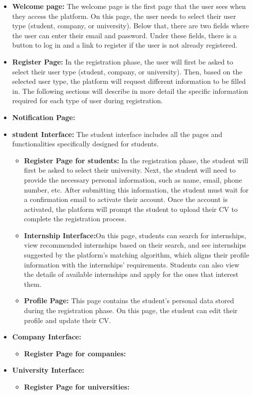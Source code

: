 \begin{itemize}
    \item \textbf{Welcome page:} The welcome page is the first page that the user sees when they access the platform. On this page, the user
    needs to select their user type (student, company, or university). Below that, there are two fields where the user can enter their email
    and password. Under these fields, there is a button to log in and a link to register if the user is not already registered.
    
    \item \textbf{Register Page:} In the registration phase, the user will first be asked to select their user type (student, company, or 
    university). Then, based on the selected user type, the platform will request different information to be filled in. 
    The following sections will describe in more detail the specific information required for each type of user during registration.

    \item \textbf{Notification Page:} 

    \item \textbf{student Interface:} The student interface includes all the pages and functionalities specifically designed for students.
    \begin{itemize}
        \item \textbf{Register Page for students:} In the registration phase, the student will first be asked to select their university. 
        Next, the student will need to provide the necessary personal information, such as name, email, phone number, etc. After submitting
        this information, the student must wait for a confirmation email to activate their account. Once the account is activated, the 
        platform will prompt the student to upload their CV to complete the registration process.

        \item \textbf{Internship Interface:}On this page, students can search for internships, view recommended internships based on their
         search, and see internships suggested by the platform's matching algorithm, which aligns their profile information with the 
         internships' requirements. Students can also view the details of available internships and apply for the ones that interest them.
        \item \textbf{Profile Page:} This page contains the student's personal data stored during the registration phase. On this page, 
        the student can edit their profile and update their CV.
    \end{itemize}
    \item \textbf{Company Interface:} 
    \begin{itemize}
       \item \textbf{Register Page for companies:} 
    \end{itemize}
    \item \textbf{University Interface:} 
    \begin{itemize}
        \item \textbf{Register Page for universities:}
    \end{itemize}
\end{itemize}
